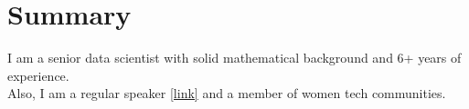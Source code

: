 \documentclass[letterpaper]{deedy-resume} %
\begin{document}

\lastupdated %

\begin{minipage}[t][0.2\textheight][t]{\textwidth}



\section{Summary} 

\begin{flushleft}
I am a senior data scientist with solid mathematical background and 6+ years of experience.
\\
Also, I am a regular speaker \href{https://github.com/LenaVolzhina/personal}{[link]} and a member of women tech communities.
\end{flushleft}
\sectionspace
\end{minipage}

\end{document}
